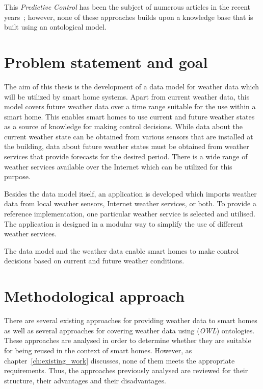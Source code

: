 This \emph{Predictive Control} has been the subject of numerous articles in the recent years~\cite{predictive_control1,predictive_control2,predictive_control3}; however, none of these approaches builds upon a knowledge base that is built using an ontological model.

\section{Problem statement and goal}

The aim of this thesis is the development of a data model for weather data which will be utilized by smart home systems. Apart from current weather data, this model covers future weather data over a time range suitable for the use within a smart home. This enables smart homes to use current and future weather states as a source of knowledge for making control decisions. While data about the current weather state can be obtained from various sensors that are installed at the building, data about future weather states must be obtained from weather services that provide forecasts for the desired period. There is a wide range of weather services available over the Internet which can be utilized for this purpose.

Besides the data model itself, an application is developed which imports weather data from local weather sensors, Internet weather services, or both. To provide a reference implementation, one particular weather service is selected and utilised. The application is designed in a modular way to simplify the use of different weather services.

The data model and the weather data enable smart homes to make control decisions based on current and future weather conditions.

\section{Methodological approach}

There are several existing approaches for providing weather data to smart homes as well as several approaches for covering weather data using (\emph{OWL}) ontologies. These approaches are analysed in order to determine whether they are suitable for being reused in the context of smart homes. However, as chapter~\ref{ch:existing_work} discusses, none of them meets the appropriate requirements. Thus, the approaches previously analysed are reviewed for their structure, their advantages and their disadvantages.

